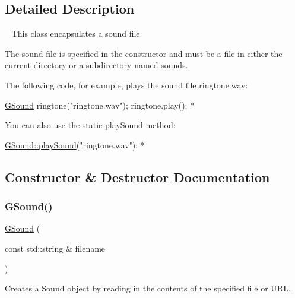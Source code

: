 \subsection{Detailed Description}
~\newline
 This class encapsulates a sound file. 

The sound file is specified in the constructor and must be a file in either the current directory or a subdirectory named {\ttfamily sounds}.

The following code, for example, plays the sound file {\ttfamily ringtone.\+wav}\+:


\begin{DoxyPre}
     \mbox{\hyperlink{classGSound}{GSound}} ringtone("ringtone.wav");
     ringtone.play();
*\end{DoxyPre}


You can also use the static {\ttfamily play\+Sound} method\+:


\begin{DoxyPre}
     \mbox{\hyperlink{classGSound_a33b24517799bad56a19cfe26b3f962ae}{GSound::playSound}}("ringtone.wav");
*\end{DoxyPre}
 

\subsection{Constructor \& Destructor Documentation}
\mbox{\label{classGSound_a981dcd44480101dbeb769d9fb93ef9b2}} 
\subsubsection{\texorpdfstring{G\+Sound()}{GSound()}}
{\footnotesize\ttfamily \mbox{\hyperlink{classGSound}{G\+Sound}} (\begin{DoxyParamCaption}\item[{const std\+::string \&}]{filename }\end{DoxyParamCaption})}



Creates a {\ttfamily Sound} object by reading in the contents of the specified file or U\+RL. 

\mbox{\label{classGSound_a417fb21fbcfa4b731a58854dd4005da7}} 
